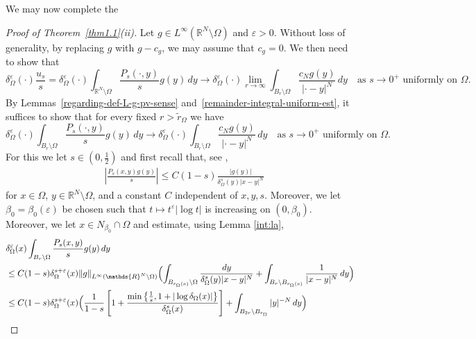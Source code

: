 \documentclass[notitlepage,11pt,reqno]{amsart}
\theoremstyle{definition}
\numberwithin{equation}{section}
\newcommand{\eps}{{\varepsilon}}
\newcommand{\R}{\mathds{R}}
\begin{document}
We may now complete the
\begin{proof}[Proof of Theorem~\ref{thm1.1}(ii)]
  Let $g \in L^\infty(\R^N \setminus \Omega)$ and $\eps>0$. Without loss of generality, by replacing $g$ with $g-c_g$, we may assume that $c_g=0$. We then need to show that
  \begin{equation*}
    \label{eq:sufficient-theorem1-1-ii-0}
\delta^{\varepsilon}_{\Omega}(\cdot)\frac{u_s}{s} = \delta^{\varepsilon}_{\Omega}(\cdot) \int_{\R^N \setminus \Omega}\frac{P_s(\cdot, y)}{s}g(y)\, dy \to \delta^{\varepsilon}_{\Omega}(\cdot) \lim_{r \to \infty}\int_{B_r \setminus \Omega} \frac{c_Ng(y)}{|\cdot-y|^N}\,dy \quad
  \text{as $s \to 0^+$ uniformly on $\Omega$.}
\end{equation*}
By Lemmas~\ref{regarding-def-L-g-pv-sense} and~\ref{remainder-integral-uniform-est}, it suffices to show that for every fixed $r>\tilde r_\Omega$ we have 
  \begin{equation}
    \label{eq:sufficient-theorem1-1-ii}
    \delta^{\varepsilon}_{\Omega}(\cdot) \int_{B_r \setminus \Omega}\frac{P_s(\cdot, y)}{s}g(y)\, dy \to \delta^{\varepsilon}_{\Omega}(\cdot)
    \int_{B_r \setminus \Omega} \frac{c_Ng(y)}{|\cdot-y|^N}\,dy \quad \text{as $s \to 0^+$ uniformly on $\Omega$.}
\end{equation}
For this we let $s \in (0,\frac{1}{2})$ and first recall that, see \cite[Remark 3.8]{Chen99},
\begin{align}\label{EQ4.10}
&\left|\frac{P_s(x,y)g(y)}{s}\right| \leq C(1-s)\frac{|g(y)|}{\delta^s_{\Omega}(y)|x-y|^N}
\end{align}
for $x \in \Omega$, $y \in \R^N \setminus \Omega$, and a constant $C$ independent of $x,y,s$. Moreover, we let $\beta_0= \beta_0(\eps)$ be chosen such that $t \mapsto t^\eps |\log t|$ is increasing on $(0,\beta_0)$. Moreover, we let $x \in N_{\beta_0} \cap \Omega$ and estimate, using Lemma \ref{int:la},
\begin{align*}
  &\delta^{\varepsilon}_{\Omega}(x) \int_{B_r \setminus \Omega}\frac{P_s(x, y)}{s}g(y)\, dy\\
  &\leq C(1-s)\delta^{s+\varepsilon}_{\Omega}(x) \|g\|_{L^{\infty}(\R^N \setminus \Omega)}\Bigl( \int_{B_{r_{\Omega}(x)}\setminus \Omega}\frac{dy}{\delta^s_{\Omega}(y)|x-y|^N}+\int_{B_r \setminus B_{r_{\Omega}(x)}}\frac{1}{|x-y|^{N}}\,dy\Bigr)\\
  &\leq C(1-s)\delta^{s+\varepsilon}_{\Omega}(x)\Bigl(\frac{1}{1-s}\left[1+\frac{\min\left\{\frac{1}{s}, 1+|\log\delta_{\Omega}(x)|\right\}}{\delta^s_{\Omega}(x)}\right]+ \int_{B_{2r} \setminus B_{r_{\Omega}}}|y|^{-N}\,dy\Bigr)\\

\end{align*}
\end{proof}
\end{document}
